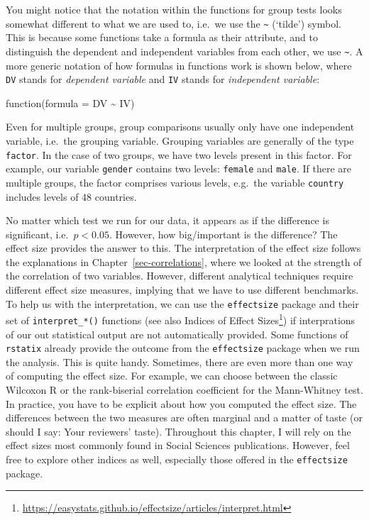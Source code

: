 \documentclass[
  letterpaper,
]{krantz}
\renewcommand{\href}[2]{#2\footnote{\url{#1}}}
\begin{document}
You might notice that the notation within the functions for group tests
looks somewhat different to what we are used to, i.e.~we use the
\texttt{\textasciitilde{}} (`tilde') symbol. This is because some
functions take a formula as their attribute, and to distinguish the
dependent and independent variables from each other, we use
\texttt{\textasciitilde{}}. A more generic notation of how formulas in
functions work is shown below, where \texttt{DV} stands for
\emph{dependent variable} and \texttt{IV} stands for \emph{independent
variable}:

\label{formulas-in-functions}
function(formula = DV \textasciitilde{} IV)

Even for multiple groups, group comparisons usually only have one
independent variable, i.e.~the grouping variable. Grouping variables are
generally of the type \texttt{factor}. In the case of two groups, we
have two levels present in this factor. For example, our variable
\texttt{gender} contains two levels: \texttt{female} and \texttt{male}.
If there are multiple groups, the factor comprises various levels,
e.g.~the variable \texttt{country} includes levels of 48 countries.

No matter which test we run for our data, it appears as if the
difference is significant, i.e.~\(p < 0.05\). However, how big/important
is the difference? The effect size provides the answer to this. The
interpretation of the effect size follows the explanations in
Chapter~\ref{sec-correlations}, where we looked at the strength of the
correlation of two variables. However, different analytical techniques
require different effect size measures, implying that we have to use
different benchmarks. To help us with the interpretation, we can use the
\texttt{effectsize} package and their set of \texttt{interpret\_*()}
functions (see also
\href{https://easystats.github.io/effectsize/articles/interpret.html}{Indices
of Effect Sizes}) if interprations of our out statistical output are not
automatically provided. Some functions of \texttt{rstatix} already
provide the outcome from the \texttt{effectsize} package when we run the
analysis. This is quite handy. Sometimes, there are even more than one
way of computing the effect size. For example, we can choose between the
classic Wilcoxon R or the rank-biserial correlation coefficient for the
Mann-Whitney test. In practice, you have to be explicit about how you
computed the effect size. The differences between the two measures are
often marginal and a matter of taste (or should I say: Your reviewers'
taste). Throughout this chapter, I will rely on the effect sizes most
commonly found in Social Sciences publications. However, feel free to
explore other indices as well, especially those offered in the
\texttt{effectsize} package.
\end{document}

